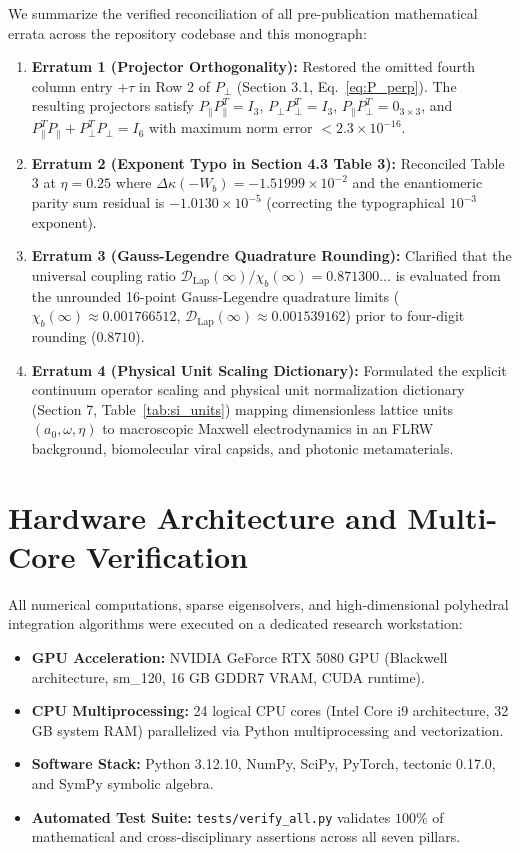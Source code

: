\documentclass[11pt,a4paper]{article}
\theoremstyle{definition}
\begin{document}
We summarize the verified reconciliation of all pre-publication mathematical errata across the repository codebase and this monograph:
\begin{enumerate}
    \item \textbf{Erratum 1 (Projector Orthogonality):} Restored the omitted fourth column entry $+\tau$ in Row 2 of $P_\perp$ (Section 3.1, Eq.~\eqref{eq:P_perp}). The resulting projectors satisfy $P_\parallel P_\parallel^T = I_3$, $P_\perp P_\perp^T = I_3$, $P_\parallel P_\perp^T = 0_{3 \times 3}$, and $P_\parallel^T P_\parallel + P_\perp^T P_\perp = I_6$ with maximum norm error $< 2.3 \times 10^{-16}$.
    \item \textbf{Erratum 2 (Exponent Typo in Section 4.3 Table 3):} Reconciled Table 3 at $\eta=0.25$ where $\Delta\kappa(-W_b) = -1.51999 \times 10^{-2}$ and the enantiomeric parity sum residual is $-1.0130 \times 10^{-5}$ (correcting the typographical $10^{-3}$ exponent).
    \item \textbf{Erratum 3 (Gauss-Legendre Quadrature Rounding):} Clarified that the universal coupling ratio $\mathcal{D}_{\mathrm{Lap}}(\infty)/\chi_b(\infty) = 0.871300\dots$ is evaluated from the unrounded 16-point Gauss-Legendre quadrature limits ($\chi_b(\infty) \approx 0.001766512$, $\mathcal{D}_{\mathrm{Lap}}(\infty) \approx 0.001539162$) prior to four-digit rounding ($0.8710$).
    \item \textbf{Erratum 4 (Physical Unit Scaling Dictionary):} Formulated the explicit continuum operator scaling and physical unit normalization dictionary (Section 7, Table~\ref{tab:si_units}) mapping dimensionless lattice units $(a_0, \omega, \eta)$ to macroscopic Maxwell electrodynamics in an FLRW background, biomolecular viral capsids, and photonic metamaterials.
\end{enumerate}

\section{Hardware Architecture and Multi-Core Verification}

All numerical computations, sparse eigensolvers, and high-dimensional polyhedral integration algorithms were executed on a dedicated research workstation:
\begin{itemize}
    \item \textbf{GPU Acceleration:} NVIDIA GeForce RTX 5080 GPU (Blackwell architecture, sm\_120, 16 GB GDDR7 VRAM, CUDA runtime).
    \item \textbf{CPU Multiprocessing:} 24 logical CPU cores (Intel Core i9 architecture, 32 GB system RAM) parallelized via Python multiprocessing and vectorization.
    \item \textbf{Software Stack:} Python 3.12.10, NumPy, SciPy, PyTorch, tectonic 0.17.0, and SymPy symbolic algebra.
    \item \textbf{Automated Test Suite:} \texttt{tests/verify\_all.py} validates $100\%$ of mathematical and cross-disciplinary assertions across all seven pillars.
\end{itemize}
\end{document}
